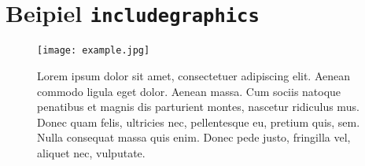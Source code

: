 \documentclass[a4paper,parskip=half]{scrartcl}
\begin{document}
\section*{Beipiel \texttt{includegraphics}}

\begin{figure}[!htb]
  \centering

  \setcapindent{1em}
  \texttt{[image: example.jpg]}
    \caption[Lorem ipsum]{Lorem ipsum dolor sit amet, consectetuer adipiscing elit.
        Aenean commodo ligula eget dolor.
        Aenean massa. Cum sociis natoque penatibus et magnis dis parturient montes, nascetur ridiculus mus.
        Donec quam felis, ultricies nec, pellentesque eu, pretium quis, sem.
        Nulla consequat massa quis enim. Donec pede justo, fringilla vel, aliquet nec, vulputate.}
  \label{fig:example}
\end{figure}
\end{document}
